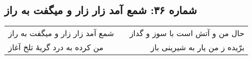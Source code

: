 \begin{center}
\section*{شماره ۳۶: شمع آمد زار زار و میگفت به راز}
\label{sec:036}
\begin{longtable}{l p{0.5cm} r}
شمع آمد زار زار و میگفت به راز
&&
حال من و آتش است با سوز و گداز
\\
من کرده به درد گریهٔ تلخ آغاز
&&
برّیده ز من یار به شیرینی باز
\\
\end{longtable}
\end{center}
